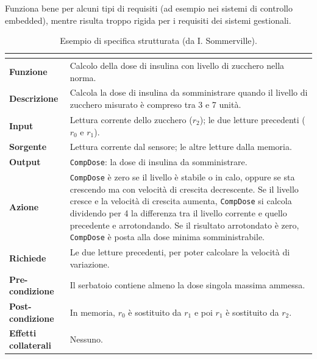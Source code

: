 
Funziona bene per alcuni tipi di requisiti (ad esempio nei sistemi di controllo embedded), mentre risulta troppo rigida per i
requisiti dei sistemi gestionali.

\begin{table}[H]
\centering
\renewcommand{\arraystretch}{1.35}
\begin{tabularx}{\textwidth}{>{\bfseries\leavevmode\color{ph2}}P{2.8cm} L}
\toprule
{} \\
\midrule
Funzione & Calcolo della dose di insulina con livello di zucchero nella norma. \\
Descrizione & Calcola la dose di insulina da somministrare quando il livello di zucchero misurato è compreso tra 3 e 7 unità. \\
Input & Lettura corrente dello zucchero ($r_2$); le due letture precedenti ($r_0$ e $r_1$). \\
Sorgente & Lettura corrente dal sensore; le altre letture dalla memoria. \\
Output & \texttt{CompDose}: la dose di insulina da somministrare. \\
Azione & \texttt{CompDose} è zero se il livello è stabile o in calo, oppure se sta crescendo ma con velocità di crescita
decrescente. Se il livello cresce e la velocità di crescita aumenta, \texttt{CompDose} si calcola dividendo per 4 la differenza
tra il livello corrente e quello precedente e arrotondando. Se il risultato arrotondato è zero, \texttt{CompDose} è posta
alla dose minima somministrabile. \\
Richiede & Le due letture precedenti, per poter calcolare la velocità di variazione. \\
Pre-condizione & Il serbatoio contiene almeno la dose singola massima ammessa. \\
Post-condizione & In memoria, $r_0$ è sostituito da $r_1$ e poi $r_1$ è sostituito da $r_2$. \\
Effetti collaterali & Nessuno. \\
\bottomrule
\end{tabularx}
\caption{Esempio di specifica strutturata (da I. Sommerville).}
\end{table}

